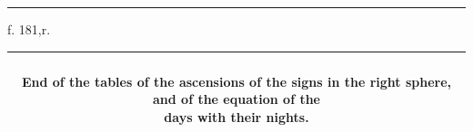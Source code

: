 \documentclass[11pt]{article}
\renewcommand{\arraystretch}{1.18}
\begin{document}
\par\vspace{-1mm}\noindent\rule{\textwidth}{.4pt}\par\vspace{1mm}
\begin{center}{\small f. 181,r.}\end{center}\vspace{-3mm}
\begin{center}\setlength{\tabcolsep}{3pt}\renewcommand{\arraystretch}{1.02}\begin{tabular}{||c|>{\centering\arraybackslash}p{27mm}|>{\centering\arraybackslash}p{25mm}||>{\centering\arraybackslash}p{27mm}|>{\centering\arraybackslash}p{25mm}||>{\centering\arraybackslash}p{27mm}|>{\centering\arraybackslash}p{25mm}||}\hline
\multicolumn{7}{||c||}{\parbox{170mm}{\centering{}\\\textbf{End of the tables of the ascensions of the signs in the right sphere, and of the equation of the}\\\textbf{days with their nights.}\vspace{1mm}}} \\ \hline

\end{tabular}
\end{center}
\end{document}
